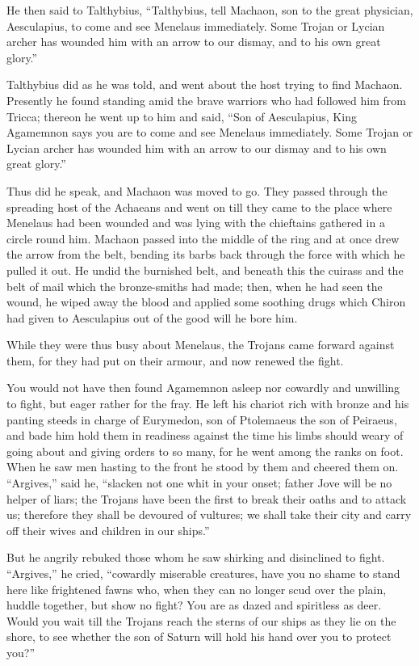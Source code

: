 He then said to Talthybius, “Talthybius, tell Machaon, son to the great
physician, Aesculapius, to come and see Menelaus immediately. Some Trojan
or Lycian archer has wounded him with an arrow to our dismay, and to his
own great glory.”

Talthybius did as he was told, and went about the host trying to find
Machaon. Presently he found standing amid the brave warriors who had
followed him from Tricca; thereon he went up to him and said, “Son of
Aesculapius, King Agamemnon says you are to come and see Menelaus
immediately. Some Trojan or Lycian archer has wounded him with an arrow to
our dismay and to his own great glory.”

Thus did he speak, and Machaon was moved to go. They passed through the
spreading host of the Achaeans and went on till they came to the place
where Menelaus had been wounded and was lying with the chieftains gathered
in a circle round him. Machaon passed into the middle of the ring and at
once drew the arrow from the belt, bending its barbs back through the
force with which he pulled it out. He undid the burnished belt, and
beneath this the cuirass and the belt of mail which the bronze-smiths had
made; then, when he had seen the wound, he wiped away the blood and
applied some soothing drugs which Chiron had given to Aesculapius out of
the good will he bore him.

While they were thus busy about Menelaus, the Trojans came forward against
them, for they had put on their armour, and now renewed the fight.

You would not have then found Agamemnon asleep nor cowardly and unwilling
to fight, but eager rather for the fray. He left his chariot rich with
bronze and his panting steeds in charge of Eurymedon, son of Ptolemaeus
the son of Peiraeus, and bade him hold them in readiness against the time
his limbs should weary of going about and giving orders to so many, for he
went among the ranks on foot. When he saw men hasting to the front he
stood by them and cheered them on. “Argives,” said he, “slacken not one
whit in your onset; father Jove will be no helper of liars; the Trojans
have been the first to break their oaths and to attack us; therefore they
shall be devoured of vultures; we shall take their city and carry off
their wives and children in our ships.”

But he angrily rebuked those whom he saw shirking and disinclined to
fight. “Argives,” he cried, “cowardly miserable creatures, have you no
shame to stand here like frightened fawns who, when they can no longer
scud over the plain, huddle together, but show no fight? You are as dazed
and spiritless as deer. Would you wait till the Trojans reach the sterns
of our ships as they lie on the shore, to see whether the son of Saturn
will hold his hand over you to protect you?”

